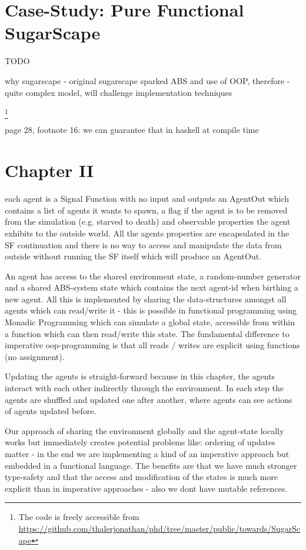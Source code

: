 \section{Case-Study: Pure Functional SugarScape}
TODO

why sugarscape
- original sugarscape sparked ABS and use of OOP, therefore 
- quite complex model, will challenge implementation techniques

\footnote{The code is freely accessible from \url{https://github.com/thalerjonathan/phd/tree/master/public/towards/SugarScape}}

\cite{weaver_replicating_nodate}

page 28, footnote 16: we can guarantee that in haskell at compile time

\section{Chapter II}
each agent is a Signal Function with no input and outputs an AgentOut which contains a list of agents it wants to spawn, a flag if the agent is to be removed from the simulation (e.g. starved to death) and observable properties the agent exhibits to the outside world. All the agents properties are encapsulated in the SF continuation and there is no way to access and manipulate the data from outside without running the SF itself which will produce an AgentOut.

An agent has access to the shared environment state, a random-number generator and a shared ABS-system state which contains the next agent-id when birthing a new agent. All this is implemented by sharing the data-structures amongst all agents which can read/write it - this is possible in functional programming using Monadic Programming which can simulate a global state, accessible from within a function which can then read/write this state. The fundamental difference to imperative oop-programming is that all reads / writes are explicit using functions (no assignment).

Updating the agents is straight-forward because in this chapter, the agents interact with each other indirectly through the environment. In each step the agents are shuffled and updated one after another, where agents can see actions of agents updated before. 

Our approach of sharing the environment globally and the agent-state locally works but immediately creates potential problems like: ordering of updates matter - in the end we are implementing a kind of an imperative approach but embedded in a functional language. The benefits are that we have much stronger type-safety and that the access and modification of the states is much more explicit than in imperative approaches - also we dont have mutable references.

